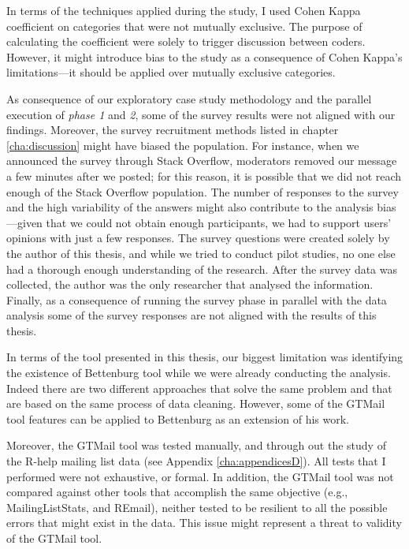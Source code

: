 \documentclass{sig-alternate-05-2015}
\begin{document}
	In terms of the techniques applied during the study, I used Cohen Kappa coefficient on categories that were not mutually exclusive. 
	The purpose of calculating the coefficient were solely to trigger discussion between coders. 
	However, it might introduce bias to the study as a consequence of Cohen Kappa's limitations---it should be applied over mutually exclusive categories.

	As consequence of our exploratory case study methodology and the parallel execution of \textit{phase 1} and \textit{2}, some of the survey results were not aligned with our findings. 
	Moreover, the survey recruitment methods listed in chapter \ref{cha:discussion} might have biased the population. 
	For instance, when we announced the survey through Stack Overflow, moderators removed our message a few minutes after we posted; for this reason, it is possible that we did not reach enough of the Stack Overflow population.
	The number of responses to the survey and the high variability of the answers might also contribute to the analysis bias---given that we could not obtain enough participants, we had to support users' opinions with just a few responses.  
	The survey questions were created solely by the author of this thesis, and while we tried to conduct pilot studies, no one else had a thorough enough understanding of the research. 
	After the survey data was collected, the author was the only researcher that analysed the information.
	Finally, as a consequence of running the survey phase in parallel with the data analysis some of the survey responses are not aligned with the results of this thesis.

	In terms of the tool presented in this thesis, our biggest limitation was identifying the existence of Bettenburg tool while we were already conducting the analysis.
	Indeed there are two different approaches that solve the same problem and that are based on the same process of data cleaning.
	However, some of the GTMail tool features can be applied to Bettenburg as an extension of his work.

	Moreover, the GTMail tool was tested manually, and through out the study of the R-help mailing list data (see Appendix \ref{cha:appendicesD}).
	All tests that I performed were not exhaustive, or formal.
	In addition, the GTMail tool was not compared against other tools that accomplish the same objective (e.g., MailingListStats, and REmail), neither tested to be resilient to all the possible errors that might exist in the data.
	This issue might represent a threat to validity of the GTMail tool.
\end{document}

